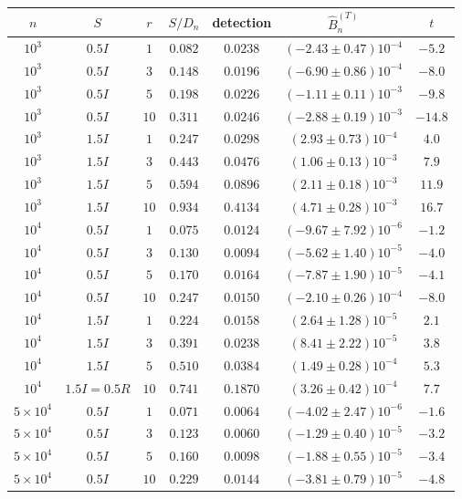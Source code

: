 \begin{table}[H]
\centering
\small
\begin{tabular}{ccccccc}
\toprule
$n$ & $S$ & $r$ & $S/D_n$ & detection & $\widehat B_n^{(T)}$ & $t$\\
\midrule
$10^3$ & $0.5I$ & $1$ & $0.082$ & $0.0238$ & $(-2.43\pm0.47)10^{-4}$ & $-5.2$\\
$10^3$ & $0.5I$ & $3$ & $0.148$ & $0.0196$ & $(-6.90\pm0.86)10^{-4}$ & $-8.0$\\
$10^3$ & $0.5I$ & $5$ & $0.198$ & $0.0226$ & $(-1.11\pm0.11)10^{-3}$ & $-9.8$\\
$10^3$ & $0.5I$ & $10$ & $0.311$ & $0.0246$ & $(-2.88\pm0.19)10^{-3}$ & $-14.8$\\
$10^3$ & $1.5I$ & $1$ & $0.247$ & $0.0298$ & $(2.93\pm0.73)10^{-4}$ & $4.0$\\
$10^3$ & $1.5I$ & $3$ & $0.443$ & $0.0476$ & $(1.06\pm0.13)10^{-3}$ & $7.9$\\
$10^3$ & $1.5I$ & $5$ & $0.594$ & $0.0896$ & $(2.11\pm0.18)10^{-3}$ & $11.9$\\
$10^3$ & $1.5I$ & $10$ & $0.934$ & $0.4134$ & $(4.71\pm0.28)10^{-3}$ & $16.7$\\
\midrule
$10^4$ & $0.5I$ & $1$ & $0.075$ & $0.0124$ & $(-9.67\pm7.92)10^{-6}$ & $-1.2$\\
$10^4$ & $0.5I$ & $3$ & $0.130$ & $0.0094$ & $(-5.62\pm1.40)10^{-5}$ & $-4.0$\\
$10^4$ & $0.5I$ & $5$ & $0.170$ & $0.0164$ & $(-7.87\pm1.90)10^{-5}$ & $-4.1$\\
$10^4$ & $0.5I$ & $10$ & $0.247$ & $0.0150$ & $(-2.10\pm0.26)10^{-4}$ & $-8.0$\\
$10^4$ & $1.5I$ & $1$ & $0.224$ & $0.0158$ & $(2.64\pm1.28)10^{-5}$ & $2.1$\\
$10^4$ & $1.5I$ & $3$ & $0.391$ & $0.0238$ & $(8.41\pm2.22)10^{-5}$ & $3.8$\\
$10^4$ & $1.5I$ & $5$ & $0.510$ & $0.0384$ & $(1.49\pm0.28)10^{-4}$ & $5.3$\\
$10^4$ & $1.5I{=}0.5R$ & $10$ & $0.741$ & $0.1870$ & $(3.26\pm0.42)10^{-4}$ & $7.7$\\
\midrule
$5{\times}10^4$ & $0.5I$ & $1$ & $0.071$ & $0.0064$ & $(-4.02\pm2.47)10^{-6}$ & $-1.6$\\
$5{\times}10^4$ & $0.5I$ & $3$ & $0.123$ & $0.0060$ & $(-1.29\pm0.40)10^{-5}$ & $-3.2$\\
$5{\times}10^4$ & $0.5I$ & $5$ & $0.160$ & $0.0098$ & $(-1.88\pm0.55)10^{-5}$ & $-3.4$\\
$5{\times}10^4$ & $0.5I$ & $10$ & $0.229$ & $0.0144$ & $(-3.81\pm0.79)10^{-5}$ & $-4.8$\\

\end{tabular}
\end{table}
